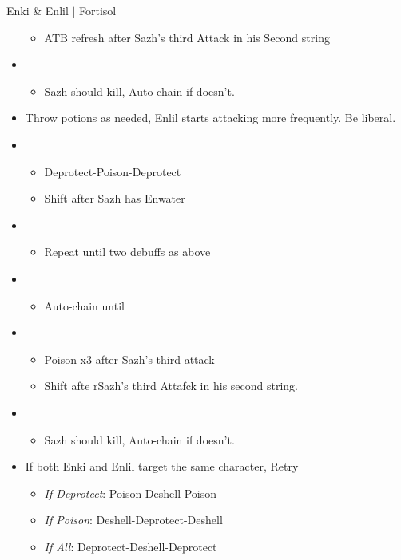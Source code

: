 \begin{battle}{Enki \& Enlil $|$ Fortisol}
\begin{multicols}{2}
\begin{itemize}
\begin{itemize}
        \item ATB refresh after Sazh's third Attack in his Second string
    \end{itemize}
    \item \first
    \begin{itemize}
        \item Sazh should kill, Auto-chain if doesn't.
    \end{itemize}
    \item Throw potions as needed, Enlil starts attacking more frequently. Be liberal.
    \item \third
    \begin{itemize}
        \item Deprotect-Poison-Deprotect
        \item Shift after Sazh has Enwater
    \end{itemize}
    \item \fifth
    \begin{itemize}
        \item Repeat until two debuffs as above
    \end{itemize}
    \item \fourth
    \begin{itemize}
        \item Auto-chain until \stagger
    \end{itemize}
    \item \sixth
    \begin{itemize}
        \item Poison x3 after Sazh's third attack
        \item Shift afte rSazh's third Attafck in his second string.
    \end{itemize}
    \item \first
    \begin{itemize}
        \item Sazh should kill, Auto-chain if doesn't.
    \end{itemize}
\end{itemize}
\columnbreak    
\begin{itemize}
    \item If both Enki and Enlil target the same character, Retry
        \begin{itemize}
            \item \textit{If Deprotect}: Poison-Deshell-Poison
            \item \textit{If Poison}: Deshell-Deprotect-Deshell
            \item \textit{If All}: Deprotect-Deshell-Deprotect

\end{itemize}
\end{itemize}
\end{multicols}
\end{battle}
